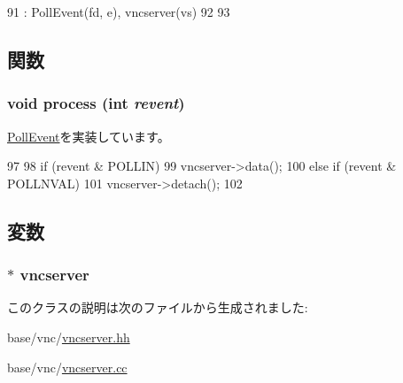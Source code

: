 \begin{DoxyCode}
91     : PollEvent(fd, e), vncserver(vs)
92 {
93 }
\end{DoxyCode}


\subsection{関数}
\hypertarget{classVncServer_1_1DataEvent_aedacbaeee0c89ceca526874c34f6b20b}{
\subsubsection[{process}]{\setlength{\rightskip}{0pt plus 5cm}void process (int {\em revent})}}
\label{classVncServer_1_1DataEvent_aedacbaeee0c89ceca526874c34f6b20b}


\hyperlink{classPollEvent_a8b870dc0eeb339499d64aa56fc0e2aa5}{PollEvent}を実装しています。


\begin{DoxyCode}
97 {
98     if (revent & POLLIN)
99         vncserver->data();
100     else if (revent & POLLNVAL)
101         vncserver->detach();
102 }
\end{DoxyCode}


\subsection{変数}
\hypertarget{classVncServer_1_1DataEvent_ac122859a241350f501e4f77da81b669f}{
\subsubsection[{vncserver}]{$\ast$ {\bf vncserver}}}
\label{classVncServer_1_1DataEvent_ac122859a241350f501e4f77da81b669f}


このクラスの説明は次のファイルから生成されました:\begin{DoxyCompactItemize}
\item 
base/vnc/\hyperlink{vncserver_8hh}{vncserver.hh}\item 
base/vnc/\hyperlink{vncserver_8cc}{vncserver.cc}\end{DoxyCompactItemize}
